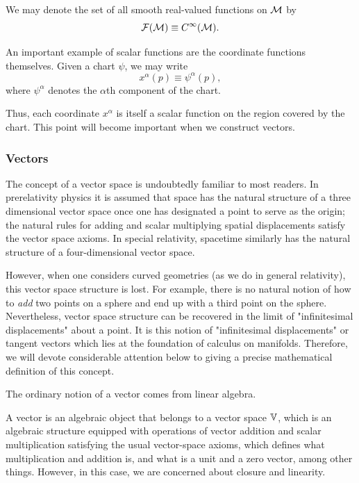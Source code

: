 		We may denote the set of all smooth real-valued functions on
		$\mathcal{M}$ by
		\begin{equation}
			\mathcal{F}(\mathcal{M})
			\equiv
			C^\infty(\mathcal{M}).
			\label{eq:smooth-function-space}
		\end{equation}

		An important example of scalar functions are the coordinate
		functions themselves. Given a chart $\psi$, we may write
		\begin{equation}
			x^\alpha(p)
			\equiv
			\psi^\alpha(p),
			\label{eq:coordinate-function}
		\end{equation}
		where $\psi^\alpha$ denotes the $\alpha$th component of the chart.

		Thus, each coordinate $x^\alpha$
		is itself a scalar function on the region covered by the chart.
		This point will become important when we construct vectors.

	\subsubsection{Vectors}
		The concept of a vector space is undoubtedly familiar to most readers. 
		In prerelativity physics it is assumed that space has the natural structure of a three
		dimensional vector space once one has designated a point to serve as the origin; the
		natural rules for adding and scalar multiplying spatial displacements satisfy the
		vector space axioms. In special relativity, spacetime similarly has the natural structure 
		of a four-dimensional vector space. 

		However, when one considers curved
		geometries (as we do in general relativity), this vector space structure is lost. For
		example, there is no natural notion of how to \textit{add} two points on a sphere and end
		up with a third point on the sphere. Nevertheless, vector space structure can be
		recovered in the limit of "infinitesimal displacements" about a point. It is this notion
		of "infinitesimal displacements" or tangent vectors which lies at the foundation of
		calculus on manifolds. Therefore, we will devote considerable attention below to
		giving a precise mathematical definition of this concept.

		The ordinary notion of a vector comes from linear algebra.

		A vector is an algebraic object that belongs to a vector space $\mathbb{V}$, which is an algebraic
		structure equipped with operations of vector addition and scalar
		multiplication satisfying the usual vector-space axioms, which defines what multiplication and 
		addition is, and what is a unit and a zero vector, among other things. However, in this case, we 
		are concerned about closure and linearity.

